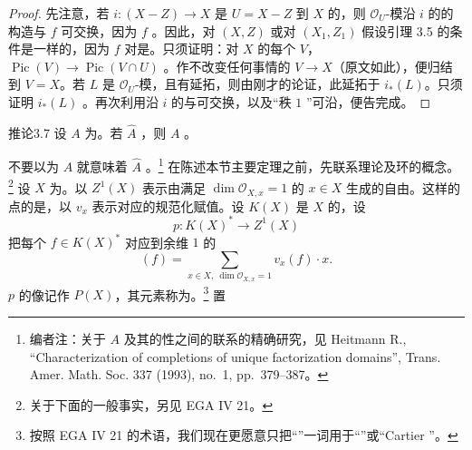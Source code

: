 \begin{proof}
先注意，若 $i:(X-Z)\to X$ 是 $U=X-Z$ 到 $X$ 的，则 $\mathcal O_U$-模沿 $i$ 的的构造与 $f$ 可交换，因为 $f$ 。因此，对 $(X,Z)$ 或对 $(X_1,Z_1)$ 假设引理 3.5 的条件是一样的，因为 $f$ 对是。只须证明：对 $X$ 的每个 $V$，$\operatorname{Pic}(V)\to\operatorname{Pic}(V\cap U)$ 。作不改变任何事情的 $V\to X$（原文如此），便归结到 $V=X$。若 $L$ 是 $\mathcal O_U$-模，且有延拓，则由刚才的论证，此延拓于 $i_*(L)$。只须证明 $i_*(L)$ 。再次利用沿 $i$ 的与可交换，以及“秩 $1$ ”可沿，便告完成。
\end{proof}
\begin{SGAresult}{推论}{3.7}
设 $A$ 为。若 $\widehat A$ ，则 $A$ 。
\end{SGAresult}
不要以为 $A$ 就意味着 $\widehat A$ 。\footnote{编者注：关于 $A$ 及其的性之间的联系的精确研究，见 Heitmann R., ``Characterization of completions of unique factorization domains'', Trans. Amer. Math. Soc. 337 (1993), no.~1, pp.~379--387。}
在陈述本节主要定理之前，先联系理论及环的概念。\footnote{关于下面的一般事实，另见 EGA IV 21。} 设 $X$ 为。以 $Z^1(X)$ 表示由满足 $\dim\mathcal O_{X,x}=1$ 的 $x\in X$ 生成的自由。这样的点的是，以 $v_x$ 表示对应的规范化赋值。设 $K(X)$ 是 $X$ 的，设
\[p:K(X)^*\longrightarrow Z^1(X)\]
把每个 $f\in K(X)^*$ 对应到余维 $1$ 的
\[(f)=\sum_{x\in X,\ \dim\mathcal O_{X,x}=1}v_x(f)\cdot x.\]
$p$ 的像记作 $P(X)$，其元素称为。\footnote{按照 EGA IV 21 的术语，我们现在更愿意只把“”一词用于“”或“Cartier ”。} 置
